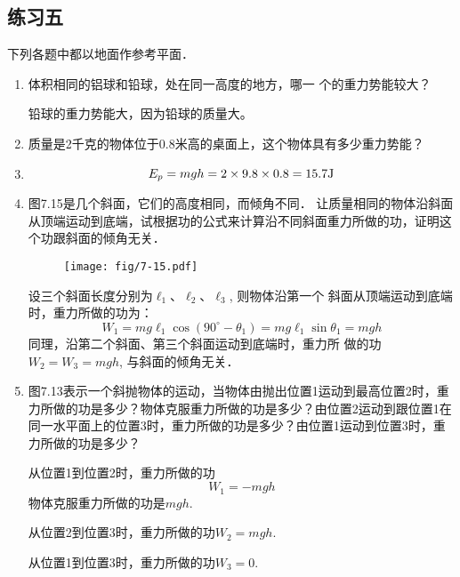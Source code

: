 \subsection{练习五}
下列各题中都以地面作参考平面．
\begin{enumerate}
    \item 体积相同的铝球和铅球，处在同一高度的地方，哪一
    个的重力势能较大？

    \begin{solution}
        铅球的重力势能大，因为铅球的质量大。
    \end{solution}
    \item 质量是2千克的物体位于0.8米高的桌面上，这个物体具有多少重力势能？
    \item 
    \begin{solution}
    \[E_p=mgh=2\times 9.8\times 0.8=15.7{\rm J}\]
    \end{solution}
    \item 图7.15是几个斜面，它们的高度相同，而倾角不同．
    让质量相同的物体沿斜面从顶端运动到底端，试根据功的公式来计算沿不同斜面重力所做的功，证明这个功跟斜面的倾角无关．
\begin{figure}[htp]
\centering \texttt{[image: fig/7-15.pdf]}
\caption{}
\end{figure}

\begin{solution}
    设三个斜面长度分别为$\ell_1$、$\ell_2$、$\ell_3$, 则物体沿第一个
    斜面从顶端运动到底端时，重力所做的功为：
  \[  W_1=mg\ell_1 \cos(90^{\circ}-\theta_1)=mg\ell_1\sin\theta_1=mgh\]
    同理，沿第二个斜面、第三个斜面运动到底端时，重力所
    做的功$W_2=W_3=mgh$, 与斜面的倾角无关．
\end{solution}
\item 图7.13表示一个斜抛物体的运动，当物体由抛出位置1运动到最高位置2时，重力所做的功是多少？物体克服重力所做的功是多少？由位置2运动到跟位置1在同一水平面上的位置3时，重力所做的功是多少？由位置1运动到位置3时，重力所做的功是多少？
\begin{figure}[htp]\centering
{}
\caption{}
\end{figure}

\begin{solution}
    从位置1到位置2时，重力所做的功
\[    W_1=-mgh\]
    物体克服重力所做的功是$mgh$.

    从位置2到位置3时，重力所做的功$W_2=mgh$.

    从位置1到位置3时，重力所做的功$W_3=0$.
\end{solution}
\end{enumerate}


